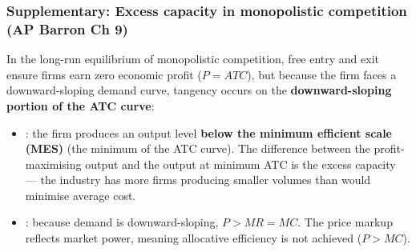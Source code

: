 \subsubsection*{Supplementary: Excess capacity in monopolistic competition (AP Barron Ch 9)}
In the long-run equilibrium of monopolistic competition, free entry and exit ensure firms earn zero economic profit ($P = ATC$), but because the firm faces a downward-sloping demand curve, tangency occurs on the \textbf{downward-sloping portion of the ATC curve}:
\begin{itemize}
  \item {}: the firm produces an output level \textbf{below the minimum efficient scale (MES)} (the minimum of the ATC curve). The difference between the profit-maximising output and the output at minimum ATC is the excess capacity --- the industry has more firms producing smaller volumes than would minimise average cost.
  \item {}: because demand is downward-sloping, $P > MR = MC$. The price markup reflects market power, meaning allocative efficiency is not achieved ($P > MC$).
\end{itemize}

